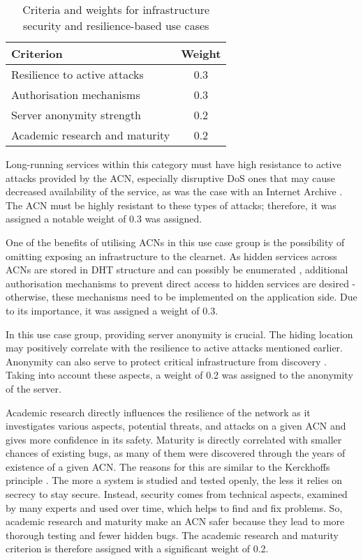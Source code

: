 \begin{table}[!ht]
\centering
\caption{Criteria and weights for infrastructure security and resilience-based use cases}
\begin{tabular}{|l|c|}
\hline
\textbf{Criterion} & \textbf{Weight} \\
\hline
Resilience to active attacks & 0.3 \\
Authorisation mechanisms & 0.3 \\
Server anonymity strength & 0.2 \\
Academic research and maturity & 0.2 \\
\hline
\end{tabular}
\label{tab:infrastructure_security_and_resilience_criteria}
\end{table}

Long-running services within this category must have high resistance to active attacks provided by the ACN, especially disruptive DoS ones that may cause decreased availability of the service, as was the case with an Internet Archive \cite{ddos-web-archive}. The ACN must be highly resistant to these types of attacks; therefore, it was assigned a notable weight of 0.3 was assigned.

One of the benefits of utilising ACNs in this use case group is the possibility of omitting exposing an infrastructure to the clearnet. As hidden services across ACNs are stored in DHT structure and can possibly be enumerated \cite{Owen2016}, additional authorisation mechanisms to prevent direct access to hidden services are desired - otherwise, these mechanisms need to be implemented on the application side. Due to its importance, it was assigned a weight of 0.3.

In this use case group, providing server anonymity is crucial. The hiding location may positively correlate with the resilience to active attacks mentioned earlier. Anonymity can also serve to protect critical infrastructure from discovery \cite{torusers}. Taking into account these aspects, a weight of 0.2 was assigned to the anonymity of the server.

Academic research directly influences the resilience of the network as it investigates various aspects, potential threats, and attacks on a given ACN and gives more confidence in its safety. Maturity is directly correlated with smaller chances of existing bugs, as many of them were discovered through the years of existence of a given ACN. The reasons for this are similar to the Kerckhoffs principle \cite{kerckhoffs}. The more a system is studied and tested openly, the less it relies on secrecy to stay secure. Instead, security comes from technical aspects, examined by many experts and used over time, which helps to find and fix problems. So, academic research and maturity make an ACN safer because they lead to more thorough testing and fewer hidden bugs. The academic research and maturity criterion is therefore assigned with a significant weight of 0.2.

